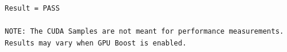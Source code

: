 \documentclass[english]{exam}
\begin{document}
\begin{lstlisting}
Result = PASS

NOTE: The CUDA Samples are not meant for performance measurements. Results may vary when GPU Boost is enabled.


\end{lstlisting}



\renewcommand{\bibname}{References}

\end{document}
